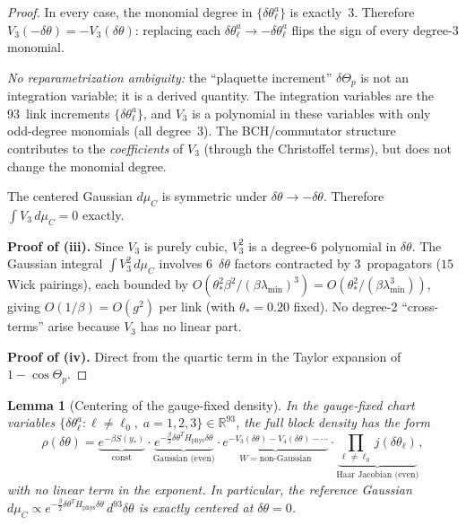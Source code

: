 \documentclass[11pt]{article}
\newtheorem{lemma}[theorem]{Lemma}
\theoremstyle{definition}
\newcommand{\R}{\mathbb{R}}
\begin{document}
\begin{proof}
In every case, the monomial degree in
$\{\delta\theta_\ell^a\}$ is exactly~3.  Therefore
$V_3(-\delta\theta)=-V_3(\delta\theta)$: replacing each
$\delta\theta_\ell^a\to -\delta\theta_\ell^a$ flips the sign
of every degree-3 monomial.

\emph{No reparametrization ambiguity:} the ``plaquette
increment'' $\delta\Theta_p$ is not an integration variable;
it is a derived quantity.  The integration variables are the
93~link increments $\{\delta\theta_\ell^a\}$, and $V_3$ is a
polynomial in these variables with only odd-degree monomials
(all degree~3).  The BCH/commutator structure contributes to
the \emph{coefficients} of $V_3$ (through the Christoffel
terms), but does not change the monomial degree.

The centered Gaussian
$d\mu_C$ is symmetric under $\delta\theta\to-\delta\theta$.
Therefore $\int V_3\,d\mu_C=0$ exactly.

\textbf{Proof of (iii).}
Since $V_3$ is purely cubic, $V_3^2$ is a degree-6 polynomial in
$\delta\theta$.  The Gaussian integral
$\int V_3^2\,d\mu_C$ involves 6~$\delta\theta$ factors contracted by
3~propagators ($15$ Wick pairings), each bounded by
$O(\theta_*^2\beta^2/(\beta\lambda_{\min})^3)
=O(\theta_*^2/(\beta\lambda_{\min}^3))$, giving
$O(1/\beta)=O(g^2)$ per link (with $\theta_*=0.20$ fixed).
No degree-2 ``cross-terms'' arise because $V_3$ has no linear part.

\textbf{Proof of (iv).} Direct from the quartic term in the Taylor
expansion of $1-\cos\Theta_p$.
\end{proof}

\begin{lemma}[Centering of the gauge-fixed density]%
\label{lem:centering}
In the gauge-fixed chart variables
$\{\delta\theta_\ell^a:\ell\ne\ell_0,\;a=1,2,3\}\in\R^{93}$,
the full block density has the form
\begin{equation}\label{eq:full-density}
\rho(\delta\theta)
=\underbrace{e^{-\beta S(y_*)}}_{\text{const}}
\cdot
\underbrace{e^{-\frac{\beta}{2}\delta\theta^T H_{\mathrm{phys}}
\delta\theta}}_{\text{Gaussian (even)}}
\cdot
\underbrace{e^{-V_3(\delta\theta)-V_4(\delta\theta)-\cdots}}_
{W=\text{non-Gaussian}}
\cdot
\underbrace{\prod_{\ell\ne\ell_0}j(\delta\theta_\ell)}_
{\text{Haar Jacobian (even)}},
\end{equation}
with \emph{no linear term in the exponent}.  In particular,
the reference Gaussian $d\mu_C\propto
e^{-\frac{\beta}{2}\delta\theta^T H_{\mathrm{phys}}\delta\theta}
\,d^{93}\delta\theta$ is exactly centered at $\delta\theta=0$.
\end{lemma}
\end{document}
